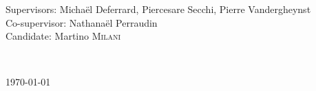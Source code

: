 \begin{titlepage}
\begin{minipage}{1\textwidth}
	\begin{flushleft} \large
		Supervisors: Micha\"el Deferrard, Piercesare Secchi, Pierre Vandergheynst\\
		Co-supervisor: Nathana\"el Perraudin\\
		\vspace{1cm}
		Candidate: Martino \textsc{Milani}
		\end{flushleft}
	\vspace{2cm}
\end{minipage}
~

{\large \today } %
\vspace{1cm}
\end{titlepage}